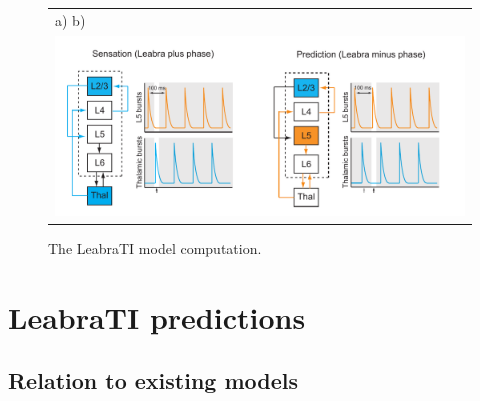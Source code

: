 \documentclass[dwyatte_dissertation.tex]{subfiles}
\begin{document}
\begin{figure}[h]
\centering
\begin{tabular}{ll}
a) \hspace{76mm} b) \\
\multicolumn{2}{c}{\includegraphics[width=160mm]{figs/leabrati/leabrati_comp.pdf}} \\
\end{tabular}
\caption{The LeabraTI model computation.}
\label{fig:leabrati_comp}
\end{figure}

\section{LeabraTI predictions}
\subsection{Relation to existing models}
\end{document}
